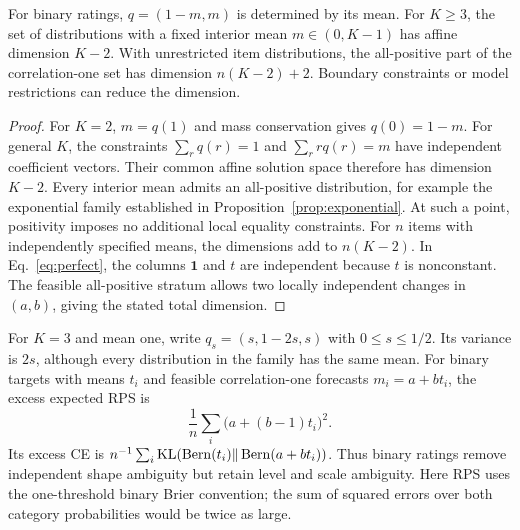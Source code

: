 \begin{proposition}\label{prop:dimension}
For binary ratings, $q=(1-m,m)$ is determined by its mean.
For $K\ge3$, the set of distributions with a fixed interior mean $m\in(0,K-1)$ has affine dimension $K-2$.
With unrestricted item distributions, the all-positive part of the correlation-one set has dimension $n(K-2)+2$.
Boundary constraints or model restrictions can reduce the dimension.
\end{proposition}
\begin{proof}
For $K=2$, $m=q(1)$ and mass conservation gives $q(0)=1-m$.
For general $K$, the constraints $\sum_r q(r)=1$ and $\sum_r r q(r)=m$ have independent coefficient vectors.
Their common affine solution space therefore has dimension $K-2$.
Every interior mean admits an all-positive distribution, for example the exponential family established in Proposition~\ref{prop:exponential}.
At such a point, positivity imposes no additional local equality constraints.
For $n$ items with independently specified means, the dimensions add to $n(K-2)$.
In Eq.~\eqref{eq:perfect}, the columns $\mathbf1$ and $t$ are independent because $t$ is nonconstant.
The feasible all-positive stratum allows two locally independent changes in $(a,b)$, giving the stated total dimension.
\end{proof}

For $K=3$ and mean one, write $q_s=(s,1-2s,s)$ with $0\le s\le1/2$.
Its variance is $2s$, although every distribution in the family has the same mean.
For binary targets with means $t_i$ and feasible correlation-one forecasts $m_i=a+bt_i$, the excess expected RPS is
\[
 \frac1n\sum_i\big(a+(b-1)t_i\big)^2.
\]
Its excess CE is $n^{-1}\sum_i\operatorname{KL}(\operatorname{Bern}(t_i)\Vert\operatorname{Bern}(a+bt_i))$.
Thus binary ratings remove independent shape ambiguity but retain level and scale ambiguity.
Here RPS uses the one-threshold binary Brier convention; the sum of squared errors over both category probabilities would be twice as large.

